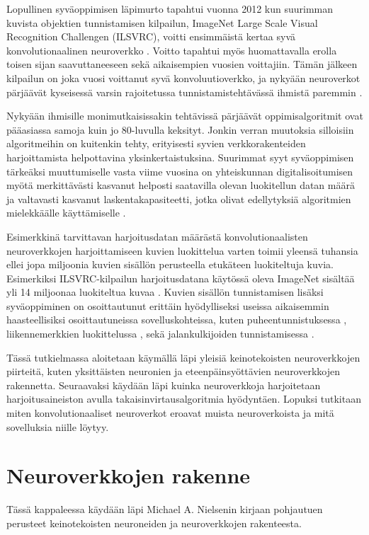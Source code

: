 \documentclass[finnish]{tktltiki2}
\theoremstyle{definition}
\theoremstyle{remark}
\begin{document}
  Lopullinen syväoppimisen läpimurto tapahtui vuonna 2012 kun suurimman kuvista objektien tunnistamisen kilpailun, ImageNet Large Scale Visual Recognition Challengen (ILSVRC), voitti ensimmäistä kertaa syvä konvolutionaalinen neuroverkko \cite{KSHimagenet2012}. Voitto tapahtui myös huomattavalla erolla toisen sijan saavuttaneeseen sekä aikaisempien vuosien voittajiin. Tämän jälkeen kilpailun on joka vuosi voittanut syvä konvoluutioverkko, ja nykyään neuroverkot pärjäävät kyseisessä varsin rajoitetussa tunnistamistehtävässä ihmistä paremmin \cite{Goodfellow-et-al-2016}.

  Nykyään ihmisille monimutkaisissakin tehtävissä pärjäävät oppimisalgoritmit ovat pääasiassa samoja kuin jo 80-luvulla keksityt. Jonkin verran muutoksia silloisiin algoritmeihin on kuitenkin tehty, erityisesti syvien verkkorakenteiden harjoittamista helpottavina yksinkertaistuksina. Suurimmat syyt syväoppimisen tärkeäksi muuttumiselle vasta viime vuosina on yhteiskunnan digitalisoitumisen myötä merkittävästi kasvanut helposti saatavilla olevan luokitellun datan määrä ja valtavasti kasvanut laskentakapasiteetti, jotka olivat edellytyksiä algoritmien mielekkäälle käyttämiselle \cite{Goodfellow-et-al-2016}.

  Esimerkkinä tarvittavan harjoitusdatan määrästä konvolutionaalisten neuroverkkojen harjoittamiseen kuvien luokittelua varten toimii yleensä tuhansia ellei jopa miljoonia kuvien sisällön perusteella etukäteen luokiteltuja kuvia. Esimerkiksi ILSVRC-kilpailun harjoitusdatana käytössä oleva ImageNet sisältää yli 14 miljoonaa luokiteltua kuvaa \cite{imagenet-website}. Kuvien sisällön tunnistamisen lisäksi syväoppiminen on osoittautunut erittäin hyödylliseksi useissa aikaisemmin haasteellisiksi osoittautuneissa sovelluskohteissa, kuten puheentunnistuksessa \cite{abdel2012applying}, liikennemerkkien luokittelussa \cite{sermanet2011traffic}, sekä jalankulkijoiden tunnistamisessa \cite{szarvas2005pedestrian}.

  Tässä tutkielmassa aloitetaan käymällä läpi yleisiä keinotekoisten neuroverkkojen piirteitä, kuten yksittäisten neuronien ja eteenpäinsyöttävien neuroverkkojen rakennetta. Seuraavaksi käydään läpi kuinka neuroverkkoja harjoitetaan harjoitusaineiston avulla takaisinvirtausalgoritmia hyödyntäen. Lopuksi tutkitaan miten konvolutionaaliset neuroverkot eroavat muista neuroverkoista ja mitä sovelluksia niille löytyy.

  \section{Neuroverkkojen rakenne}
  Tässä kappaleessa käydään läpi Michael A. Nielsenin kirjaan \cite{Nielsen-neural} pohjautuen perusteet keinotekoisten neuroneiden ja neuroverkkojen rakenteesta. 
\end{document}
